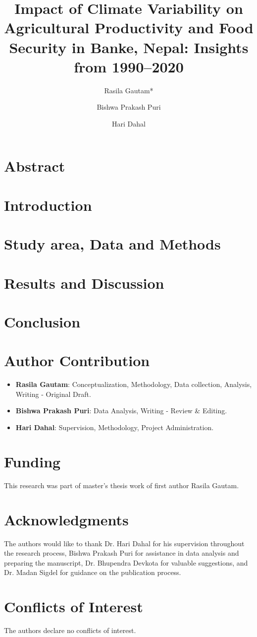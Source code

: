 \documentclass[a4paper,12pt]{article}
\title{Impact of Climate Variability on Agricultural Productivity and Food Security in Banke, Nepal: Insights from 1990--2020}
\author[1]{Rasila Gautam*}
\author[1]{Bishwa Prakash Puri}
\author[1]{Hari Dahal}
\affil[1]{College of Applied Sciences-Nepal, Tribhuvan University, Kathmandu, Nepal}
\affil[*]{Correspondence Author: \texttt{rasilagautam2@gmail.com}}
\date{}
\begin{document}
\maketitle

\section*{Abstract}



\section{Introduction}


\section{Study area, Data and Methods}


\section{Results and Discussion}




\section{Conclusion}


\section*{Author Contribution}
\begin{itemize}
    \item \textbf{Rasila Gautam}: Conceptualization, Methodology, Data collection, Analysis, Writing - Original Draft.
    \item \textbf{Bishwa Prakash Puri}: Data Analysis, Writing - Review \& Editing.
    \item \textbf{Hari Dahal}: Supervision, Methodology, Project Administration.
\end{itemize}
\section*{Funding}
This research was part of master's thesis work of first author Rasila Gautam.

\section*{Acknowledgments}
The authors would like to thank Dr. Hari Dahal for his supervision throughout the research process, Bishwa Prakash Puri for assistance in data analysis and preparing the manuscript, Dr. Bhupendra Devkota for valuable suggestions, and Dr. Madan Sigdel for guidance on the publication process.


\section*{Conflicts of Interest}
The authors declare no conflicts of interest.
\printbibliography
\end{document}
